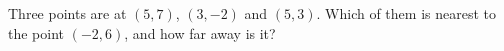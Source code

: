 Three points are at $(5,7)$, $(3,-2)$ and $(5,3)$. Which of them is nearest to the point $(-2,6)$, and how far away is it?
